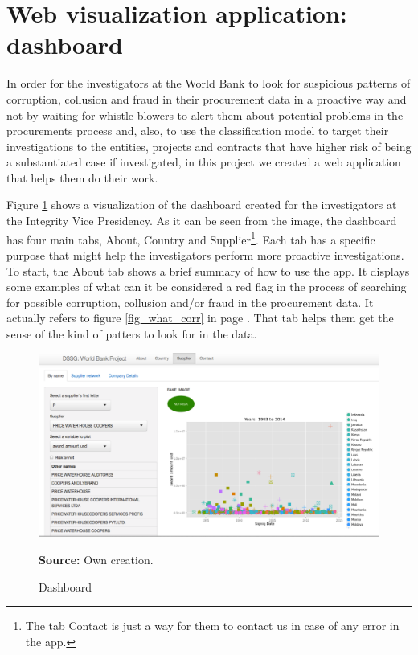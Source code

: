 \section{Web visualization application: dashboard} \label{sec_visual}

In order for the investigators at the World Bank to look for suspicious patterns of corruption, collusion and fraud in their procurement data in a proactive way and not by waiting for whistle-blowers to alert them about potential  problems in the procurements process and, also, to use the classification model to target their investigations to the entities, projects and contracts that have higher risk of being a substantiated case if investigated, in this project we created a web application that helps them do their work. 


Figure \ref{fig_dashboard} shows a visualization of the dashboard created for the investigators at the Integrity Vice Presidency. As it can be seen from the image, the dashboard has four main tabs, About, Country and Supplier\footnote{The tab Contact is just a way for them to contact us in case of any error in the app.}. Each tab has a specific purpose that might help the investigators perform more proactive investigations. To start, the About tab shows a brief summary of how to use the app. It displays some examples of what can it be considered a red flag in the process of searching for possible corruption, collusion and/or fraud in the procurement data. It actually refers to figure \ref{fig_what_corr} in page \pageref{fig_what_corr}. That tab helps them get the sense of the kind of patters to look for in the data.

\begin{figure}[H]
\begin{center}
\caption{Dashboard}
\label{fig_dashboard}
\includegraphics[width=1.05\textwidth,keepaspectratio]{../img/dashboard.pdf}
\end{center}
\noindent \footnotesize{\textbf{Source:} Own creation.}
\end{figure}


